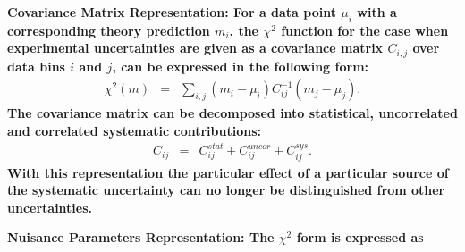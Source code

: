 \begin{description}
\item \bf {Covariance Matrix Representation:} \rm
For a data point  $\mu_i$ with a corresponding theory prediction $m_i$, the $\chi^2$ function for the case when experimental uncertainties are given as 
a covariance matrix $C_{i,j}$ over data bins $i$ and $j$, can be expressed in the following form:
%
\begin{eqnarray}
\chi^2 (m)& = & \sum_{i,j}(m_i-\mu_i)C^{-1}_{ij}(m_j-\mu_j).
\end{eqnarray}
The covariance matrix can be decomposed into statistical, uncorrelated and correlated systematic contributions: 
\begin{eqnarray}
C_{ij}& = & C^{stat}_{ij}+C^{uncor}_{ij}+C^{sys}_{ij}.
\end{eqnarray}
With this representation the particular effect of a particular source of the systematic uncertainty 
can no longer be distinguished from other uncertainties.

\item \bf{Nuisance Parameters Representation:} \rm
The $\chi^2$ form is expressed as
\label{sec:nuisance_representation}


\end{description}
